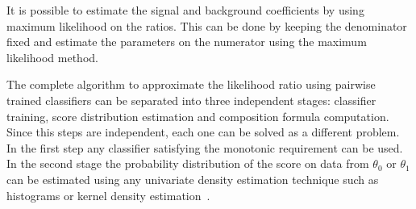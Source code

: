 \documentclass[a4paper]{jpconf}
\DeclareMathOperator*{\argmax}{arg\,max}
\begin{document}

It is possible to estimate the signal and background coefficients by using maximum likelihood on the ratios. This can be done by keeping the denominator fixed and estimate the parameters on the numerator using the maximum likelihood method.


The complete algorithm to approximate the likelihood ratio using pairwise trained classifiers can be separated into three independent stages: classifier training, score distribution estimation and composition formula computation. Since this steps are independent, each one can be solved as a different problem. In the first step any classifier satisfying the monotonic requirement can be used. In the second stage the probability distribution of the score on data from $\theta_0$ or $\theta_1$ can be estimated using any univariate density estimation technique such as histograms or kernel density estimation~\cite{Verkerke:2003ir,Cranmer:2000du}. 
\end{document}
